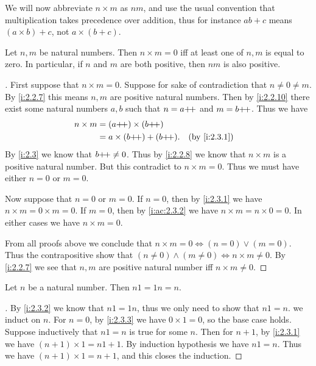 \begin{note}
  We will now abbreviate \(n \times m\) as \(nm\), and use the usual convention that multiplication takes precedence over addition, thus for instance \(ab + c\) means \((a \times b) + c\), not \(a \times (b + c)\).
\end{note}

\begin{lem}\label{i:2.3.3}
  Let \(n, m\) be natural numbers.
  Then \(n \times m = 0\) iff at least one of \(n, m\) is equal to zero.
  In particular, if \(n\) and \(m\) are both positive, then \(nm\) is also positive.
\end{lem}

\begin{proof}[]
  First suppose that \(n \times m = 0\).
  Suppose for sake of contradiction that \(n \neq 0 \neq m\).
  By \cref{i:2.2.7} this means \(n, m\) are positive natural numbers.
  Then by \cref{i:2.2.10} there exist some natural numbers \(a, b\) such that \(n = a{+}\!{+}\) and \(m = b{+}\!{+}\).
  Thus we have
  \begin{align*}
    n \times m & = (a\pp) \times (b\pp)                        \\
               & = a \times (b\pp) + (b\pp). &  & \by{i:2.3.1}
  \end{align*}
  By \cref{i:2.3} we know that \(b{+}\!{+} \neq 0\).
  Thus by \cref{i:2.2.8} we know that \(n \times m\) is a positive natural number.
  But this contradict to \(n \times m = 0\).
  Thus we must have either \(n = 0\) or \(m = 0\).

  Now suppose that \(n = 0\) or \(m = 0\).
  If \(n = 0\), then by \cref{i:2.3.1} we have \(n \times m = 0 \times m = 0\).
  If \(m = 0\), then by \cref{i:ac:2.3.2} we have \(n \times m = n \times 0 = 0\).
  In either cases we have \(n \times m = 0\).

  From all proofs above we conclude that \(n \times m = 0 \iff (n = 0) \lor (m = 0)\).
  Thus the contrapositive show that \((n \neq 0) \land (m \neq 0) \iff n \times m \neq 0\).
  By \cref{i:2.2.7} we see that \(n, m\) are positive natural number iff \(n \times m \neq 0\).
\end{proof}

\begin{ac}\label{i:ac:2.3.4}
  Let \(n\) be a natural number.
  Then \(n1 = 1n = n\).
\end{ac}

\begin{proof}[]
  By \cref{i:2.3.2} we know that \(n1 = 1n\), thus we only need to show that \(n1 = n\).
  we induct on \(n\).
  For \(n=0\), by \cref{i:2.3.3} we have \(0 \times 1 = 0\), so the base case holds.
  Suppose inductively that \(n1 = n\) is true for some \(n\).
  Then for \(n + 1\), by \cref{i:2.3.1} we have \((n + 1) \times 1 = n1 + 1\).
  By induction hypothesis we have \(n1 = n\).
  Thus we have \((n + 1) \times 1 = n + 1\), and this closes the induction.
\end{proof}

